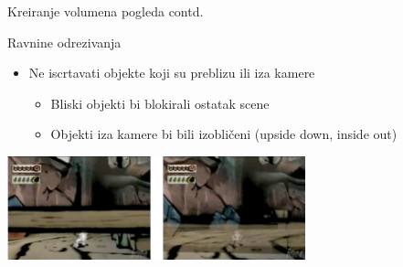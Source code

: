 \documentclass[9pt]{beamer}
\begin{document}
\begin{frame}{Kreiranje volumena pogleda contd.}
	\begin{block}{Ravnine odrezivanja}
		\begin{itemize}
			\item Ne iscrtavati objekte koji su preblizu ili iza kamere
			\begin{itemize}
				\item Bliski objekti bi blokirali ostatak scene
				\item Objekti iza kamere bi bili izobličeni	(upside down, inside out)	
			\end{itemize}
		\end{itemize}
	\end{block}
	\begin{center}
		\includegraphics[height=3cm]{slike/clip_plane_near_okami.png} 
	\end{center}
\end{frame}
\end{document}
